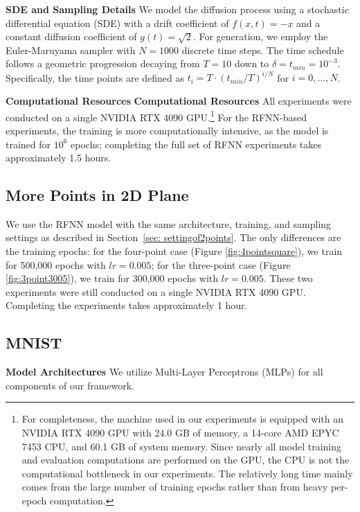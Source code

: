 \documentclass[11pt]{article}
\begin{document}
\noindent\textbf{SDE and Sampling Details} We model the diffusion process using a stochastic differential equation (SDE) with a drift coefficient of $f(x,t) = -x$ and a constant diffusion coefficient of $g(t) = \sqrt{2}$. For generation, we employ the Euler-Maruyama sampler with $N=1000$ discrete time steps. The time schedule follows a geometric progression decaying from $T=10$ down to $\delta = t_{min}=10^{-3}$. Specifically, the time points are defined as $t_i = T \cdot (t_{min}/T)^{i/N}$ for $i=0, \dots, N$.

\noindent\textbf{Computational Resources} \noindent\textbf{Computational Resources} All experiments were conducted on a single NVIDIA RTX 4090 GPU.\footnote{For completeness, the machine used in our experiments is equipped with an NVIDIA RTX 4090 GPU with 24.0 GB of memory, a 14-core AMD EPYC 7453 CPU, and 60.1 GB of system memory. Since nearly all model training and evaluation computations are performed on the GPU, the CPU is not the computational bottleneck in our experiments. The relatively long  time mainly comes from the large number of training epochs rather than from heavy per-epoch computation.} For the RFNN-based experiments, the training is more computationally intensive, as the model is trained for $10^6$ epochs; completing the full set of RFNN experiments takes approximately 1.5 hours.

\subsection{More Points in 2D Plane}
We use the RFNN model with the same architecture, training, and sampling settings as described in Section~\ref{sec: settingof2points}. The only differences are the training epochs: for the four-point case (Figure \ref{fig:4pointsquare}), we train for 500,000 epochs with $lr = 0.005$; for the three-point case (Figure \ref{fig:3point3005}), we train for 300,000 epochs with $lr = 0.005$. These two experiments were still conducted on a single NVIDIA RTX 4090 GPU. Completing the experiments takes approximately 1 hour. 
\subsection{MNIST}\label{sec:MNIST training detail}
\textbf{Model Architectures} We utilize Multi-Layer Perceptrons (MLPs) for all components of our framework.
\end{document}
